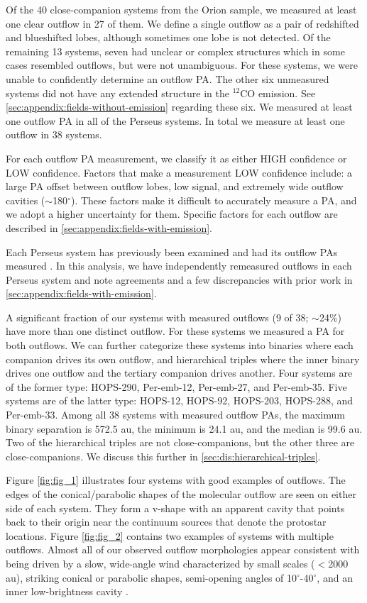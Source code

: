 \documentclass[linenumbers,twocolumn, twocolappendix]{aastex631}
\begin{document}
Of the 40 close-companion systems from the Orion sample, we measured at least one clear outflow in 27 of them. We define a single outflow as a pair of redshifted and blueshifted lobes, although sometimes one lobe is not detected. Of the remaining 13 systems, seven had unclear or complex structures which in some cases resembled outflows, but were not unambiguous. For these systems, we were unable to confidently determine an outflow PA. The other six unmeasured systems did not have any extended structure in the $^{12}$CO emission. See \ref{sec:appendix:fields-without-emission} regarding these six. We measured at least one outflow PA in all of the Perseus systems. In total we measure at least one outflow in 38 systems.

For each outflow PA measurement, we classify it as either HIGH confidence or LOW confidence. Factors that make a measurement LOW confidence include: a large PA offset between outflow lobes, low signal, and extremely wide outflow cavities ($\sim$180$^\circ$). These factors make it difficult to accurately measure a PA, and we adopt a higher uncertainty for them. Specific factors for each outflow are described in \ref{sec:appendix:fields-with-emission}.

Each Perseus system has previously been examined and had its outflow PAs measured \citep[e.g.][]{Plunkett_2013, Lee_et_al_2016, Stephens_et_al_2017, Dunham_et_al_2024}. In this analysis, we have independently remeasured outflows in each Perseus system and note agreements and a few discrepancies with prior work in \ref{sec:appendix:fields-with-emission}.

A significant fraction of our systems with measured outflows (9 of 38; $\sim$24\%) have more than one distinct outflow. For these systems we measured a PA for both outflows. We can further categorize these systems into binaries where each companion drives its own outflow, and hierarchical triples where the inner binary drives one outflow and the tertiary companion drives another. Four systems are of the former type: HOPS-290, Per-emb-12, Per-emb-27, and Per-emb-35. Five systems are of the latter type: HOPS-12, HOPS-92, HOPS-203, HOPS-288, and Per-emb-33. Among all 38 systems with measured outflow PAs, the maximum binary separation is 572.5 au, the minimum is 24.1 au, and the median is 99.6 au. Two of the hierarchical triples are not close-companions, but the other three are close-companions. We discuss this further in \ref{sec:dis:hierarchical-triples}. 

Figure \ref{fig:fig_1} illustrates four systems with good examples of outflows. The edges of the conical/parabolic shapes of the molecular outflow are seen on either side of each system. They form a v-shape with an apparent cavity that points back to their origin near the continuum sources that denote the protostar locations. Figure \ref{fig:fig_2} contains two examples of systems with multiple outflows. Almost all of our observed outflow morphologies appear consistent with being driven by a slow, wide-angle wind characterized by small scales ($<$2000 au), striking conical or parabolic shapes, semi-opening angles of 10$^\circ$-40$^\circ$, and an inner low-brightness cavity \citep[e.g.,][]{pascucci_2023, Feeney-Johansson_et_al_2024}.
\end{document}
